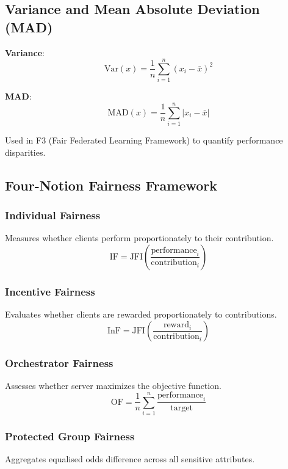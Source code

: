 \documentclass{article}
\begin{document}
\subsection{Variance and Mean Absolute Deviation (MAD)}

\textbf{Variance}:
\begin{equation}
\text{Var}(x) = \frac{1}{n}\sum_{i=1}^{n}(x_i - \bar{x})^2
\end{equation}

\textbf{MAD}:
\begin{equation}
\text{MAD}(x) = \frac{1}{n}\sum_{i=1}^{n}|x_i - \bar{x}|
\end{equation}

Used in F3 (Fair Federated Learning Framework) to quantify performance disparities.

\subsection{Four-Notion Fairness Framework}

\subsubsection{Individual Fairness}
Measures whether clients perform proportionately to their contribution.
\begin{equation}
\text{IF} = \text{JFI}\left(\frac{\text{performance}_i}{\text{contribution}_i}\right)
\end{equation}

\subsubsection{Incentive Fairness}
Evaluates whether clients are rewarded proportionately to contributions.
\begin{equation}
\text{InF} = \text{JFI}\left(\frac{\text{reward}_i}{\text{contribution}_i}\right)
\end{equation}

\subsubsection{Orchestrator Fairness}
Assesses whether server maximizes the objective function.
\begin{equation}
\text{OF} = \frac{1}{n}\sum_{i=1}^{n} \frac{\text{performance}_i}{\text{target}}
\end{equation}

\subsubsection{Protected Group Fairness}
Aggregates equalised odds difference across all sensitive attributes.
\end{document}
